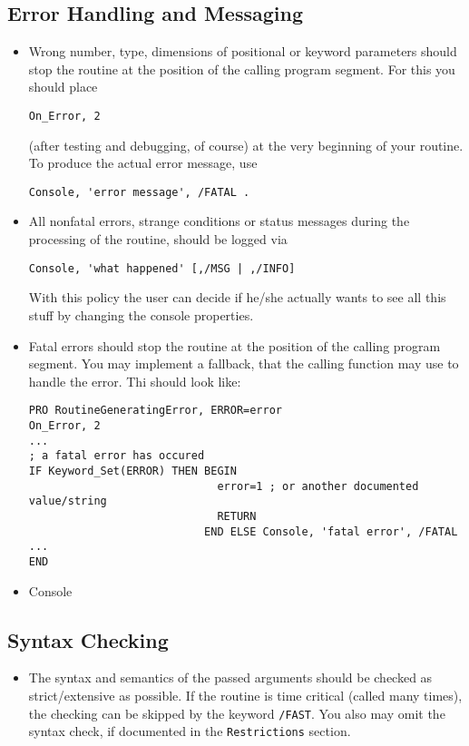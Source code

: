 \documentclass[12pt]{article}
\begin{document}
\subsection{Error Handling and Messaging}
\begin{itemize}
%
\item Wrong number, type, dimensions of positional or keyword parameters should stop the routine at the position of the calling program segment. For this you should place 
\begin{verbatim}
On_Error, 2
\end{verbatim}
(after testing and debugging, of course) at the very beginning of your routine. To produce the actual error message, use
\begin{verbatim}
Console, 'error message', /FATAL .
\end{verbatim}
%
\item All nonfatal errors, strange conditions or status messages during the processing of the routine, should be logged via
\begin{verbatim}
Console, 'what happened' [,/MSG | ,/INFO] 
\end{verbatim}
With this policy the user can decide if he/she actually wants to see all this stuff by changing the console properties.
%
\item Fatal errors should stop the routine at the position of the calling program segment. You may implement a fallback, that the calling function may use to handle the error. Thi should look like:
\begin{verbatim}
PRO RoutineGeneratingError, ERROR=error
On_Error, 2
...
; a fatal error has occured
IF Keyword_Set(ERROR) THEN BEGIN
                             error=1 ; or another documented value/string
                             RETURN
                           END ELSE Console, 'fatal error', /FATAL
...
END
\end{verbatim}
%
\item Console
%
\end{itemize}
\subsection{Syntax Checking}
\begin{itemize}
\item The syntax and semantics of the passed arguments should be checked as strict/extensive as possible. If the routine is time critical (called many times), the checking can be skipped by the keyword \texttt{/FAST}. You also may omit the syntax check, if documented in the \texttt{Restrictions} section. 
\end{itemize}
\end{document}
